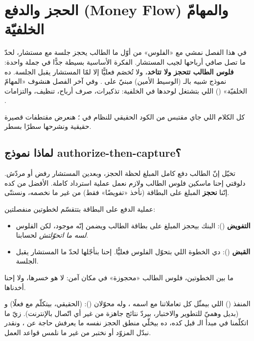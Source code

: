 \section{الحجز والدفع (Money Flow) والمهامّ الخلفيّة}

في هذا الفصل نمشي مع «الفلوس» من أوّل ما الطالب يحجز جلسة مع مستشار، لحدّ ما
تصل صافي أرباحها لجيب المستشار. الفكرة الأساسية بسيطة جدًّا في جملة واحدة:
\textbf{فلوس الطالب تتحجز ولا تتاخد}، ولا تُخصَم فعليًّا إلا لمّا المستشار يقبل
الجلسة. ده نموذج شبيه بالـ  (الوسيط الأمين) مبنيّ على .
وفي آخر الفصل هنشوف «المهامّ الخلفيّة» () اللي بتشتغل لوحدها
في الخلفية: تذكيرات، صرف أرباح، تنظيف، والتزامات .

كل الكلام اللي جاي مقتبس من الكود الحقيقي للنظام في ؛
هنعرض مقتطفات قصيرة حقيقية ونشرحها سطرًا بسطر.

\subsection{لماذا نموذج authorize-then-capture؟}

تخيّل إنّ الطالب دفع كامل المبلغ لحظة الحجز، وبعدين المستشار رفض أو مردّش. دلوقتي
إحنا ماسكين فلوس الطالب ولازم نعمل عملية استرداد كاملة. الأفضل من كده إنّنا
\textbf{نحجز} المبلغ على البطاقة (نأخذ «تفويضًا» فقط) من غير ما نخصمه، ونستنّى.

\begin{idea}
عملية الدفع على البطاقة بتتقسّم لخطوتين منفصلتين:
\begin{itemize}
\item \textbf{التفويض} (): البنك بيحجز المبلغ على بطاقة الطالب
  ويضمن إنّه موجود، لكن الفلوس \emph{لسه ما اتحوّلتش} لحسابنا.
\item \textbf{القبض} (): دي الخطوة اللي بتحوّل الفلوس فعليًّا. إحنا
  بنأجّلها لحدّ ما المستشار يقبل الجلسة.
\end{itemize}
ما بين الخطوتين، فلوس الطالب «محجوزة» في مكان آمن: لا هو خسرها، ولا إحنا أخدناها.
\end{idea}

المنفذ () اللي بيمثّل كل تعاملاتنا مع  اسمه ،
وله محوّلان ():  (الحقيقي، بيتكلّم مع 
فعلًا) و (بديل وهميّ للتطوير والاختبار، بيردّ نتائج جاهزة
من غير أي اتّصال بالإنترنت). زيّ ما اتكلّمنا في مبدأ الـ  قبل كده، ده
بيخلّي منطق الحجز نفسه ما يعرفش حاجة عن ، ونقدر نبدّل المزوّد أو نختبر
من غير ما نلمس قواعد العمل.


